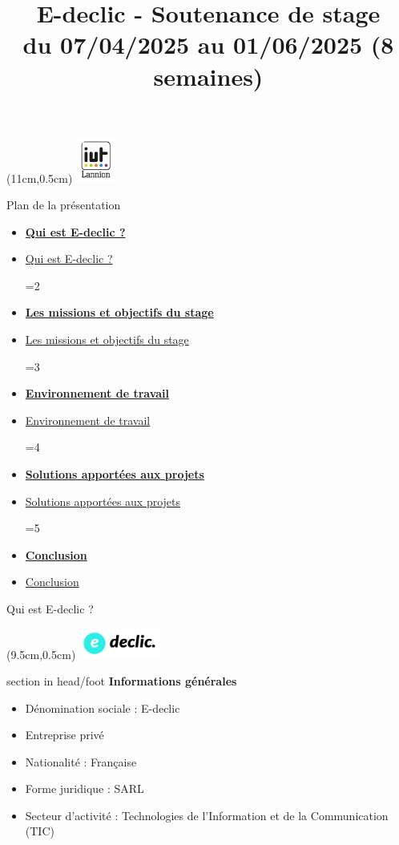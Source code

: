 \documentclass{beamer}
\title[IUT Lannion -- Soutenance Stage]{E-declic - Soutenance de stage \\ \normalsize du 07/04/2025 au 01/06/2025 (8 semaines)}
\author{\NomPrenom}
\institute{IUT de Lannion -- Département Informatique}
\date{\DateSoutenance}
\newcommand{\logoEdeclic}{
	\begin{textblock*}{2cm}(9.5cm,0.5cm)
  		\includegraphics[height=1cm]{../img/logo_e-declic.png}
	\end{textblock*}
}
\newcommand{\planLine}[4]{
  \ifnum#1=#2
    \item \hyperlink{#3}{\textbf{\large #4}}
  \else
    \item \hyperlink{#3}{#4}
  \fi
}
\newcommand{\planSlide}[1]{
  	\begin{frame}{Plan de la présentation}
  		\begin{center}
  			\begin{minipage}{1\textwidth}
				\begin{itemize}
      			\planLine{#1}{1}{organisation}{Qui est E-declic ?}
      			\planLine{#1}{2}{sujet}{Les missions et objectifs du stage}
      			\planLine{#1}{3}{environnement}{Environnement de travail}
      			\planLine{#1}{4}{realisation}{Solutions apportées aux projets}
      			\planLine{#1}{5}{conclusion}{Conclusion}
	    		\end{itemize}
  		\end{minipage}
	\end{center}
	\vfill
	\end{frame}
}
\begin{document}
\begin{frame}[plain]
	\begin{minipage}[t]{0.75\textwidth}
    		\titlepage
  	\end{minipage}
	\begin{textblock*}{2cm}(11cm,0.5cm)
    		\includegraphics[height=1.5cm]{../img/logo_iut.png}
	\end{textblock*}
\end{frame}

\planSlide{1}

\begin{frame}[label=organisation]{Qui est E-declic ?}
	\logoEdeclic

	\begin{beamercolorbox}[wd=\paperwidth,ht=1.5em,dp=0.5em,leftskip=0.5cm]{section in head/foot}
  		\large \textbf{Informations générales}
	\end{beamercolorbox}
	\vspace{0.5em}
	\begin{center}
  		\begin{minipage}{0.9\textwidth}
    			\begin{itemize}
      			\item Dénomination sociale : E-declic
      			\item Entreprise privé
				\item Nationalité : Française
      			\item Forme juridique : SARL
      			\item Secteur d'activité : Technologies de l'Information et de la Communication (TIC)
    			\end{itemize}
  		\end{minipage}
	\end{center}
	\vfill
\end{frame}
\end{document}
